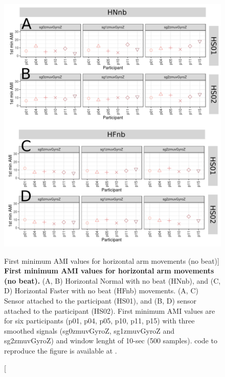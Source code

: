 \begin{figure}
\centering
\includegraphics[width=1.0\textwidth]{ami_Hnb_w10}
	\caption
	[First minimum AMI values for horizontal arm movements (no beat)]{
	{\bf First minimum AMI values for horizontal arm movements (no beat).}
		(A, B) Horizontal Normal with no beat (HNnb), and 
		(C, D) Horizontal Faster with no beat (HFnb) movements.
		(A, C) Sensor attached to the participant (HS01), and
		(B, D) sensor attached to the participant (HS02).
		First minimum AMI values are for six participants 
		(p01, p04, p05, p10, p11, p15) with three smoothed 
		signals (sg0zmuvGyroZ, sg1zmuvGyroZ and sg2zmuvGyroZ) and 
		window lenght of 10-sec (500 samples).
		\R code to reproduce the figure is available at 
		.
        }
    \label{fig:amiHnb}
\end{figure}
